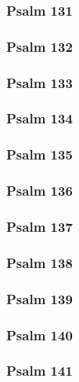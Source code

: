\documentclass[10pt]{extarticle}
\begin{document}
\begin{multicols}{2}
\subsubsection{Psalm 131}

\newpage

\subsubsection{Psalm 132}

\newpage

\subsubsection{Psalm 133}

\newpage

\subsubsection{Psalm 134}

\newpage

\subsubsection{Psalm 135}

\newpage

\subsubsection{Psalm 136}

\newpage

\subsubsection{Psalm 137}

\newpage

\subsubsection{Psalm 138}

\newpage

\subsubsection{Psalm 139}

\newpage

\subsubsection{Psalm 140}

\newpage

\subsubsection{Psalm 141}

\newpage


\end{multicols}
\end{document}
